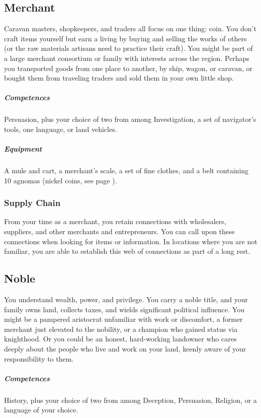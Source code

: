 \subsection*{Merchant} \label{ssec::merchant}
    Caravan masters, shopkeepers, and traders all focus on one thing: coin.
    You don't craft items yourself but earn a living by buying and selling the works of others (or the raw materials artisans need to practice their craft).
    You might be part of a large merchant consortium or family with interests across the region. Perhaps you transported goods from one place to another, by ship, wagon, or caravan, or bought them from traveling traders and sold them in your own little shop.

    \subparagraph{Competences} Persuasion, plus your choice of two from among Investigation, a set of navigator's tools, one language, or land vehicles.

    \subparagraph{Equipment} A mule and cart, a merchant's scale, a set of fine clothes, and a belt containing 10 agnomas (nickel coins, see page \pageref{sec::currency}).

    \subsubsection{Supply Chain} \label{feat::supplychain}
        From your time as a merchant, you retain connections with wholesalers, suppliers, and other merchants and entrepreneurs.
        You can call upon these connections when looking for items or information.
        In locations where you are not familiar, you are able to establish this web of connections as part of a long rest.

\subsection*{Noble} \label{ssec::noble}
    You understand wealth, power, and privilege.
    You carry a noble title, and your family owns land, collects taxes, and wields significant political influence.
    You might be a pampered aristocrat unfamiliar with work or discomfort, a former merchant just elevated to the nobility, or a champion who gained status via knighthood.
    Or you could be an honest, hard-working landowner who cares deeply about the people who live and work on your land, keenly aware of your responsibility to them.

    \subparagraph{Competences} History, plus your choice of two from among Deception, Persuasion, Religion, or a language of your choice.

